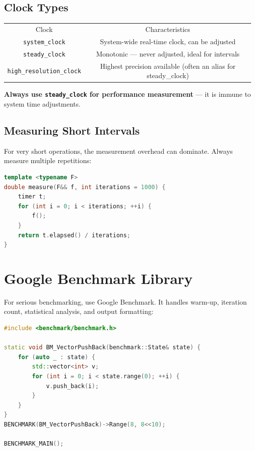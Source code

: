 \subsection{Clock Types}

\begin{center}
\begin{tabular}{cc}
\toprule
Clock & Characteristics \\
\texttt{system\_clock} & System-wide real-time clock, can be adjusted \\
\texttt{steady\_clock} & Monotonic — never adjusted, ideal for intervals \\
\texttt{high\_resolution\_clock} & Highest precision available (often an alias for steady\_clock) \\

\bottomrule
\end{tabular}
\end{center}
\textbf{Always use \texttt{steady\_clock} for performance measurement} — it is immune to system time adjustments.

\subsection{Measuring Short Intervals}

For very short operations, the measurement overhead can dominate. Always measure multiple repetitions:

\begin{lstlisting}[language=C++]
template <typename F>
double measure(F&& f, int iterations = 1000) {
    timer t;
    for (int i = 0; i < iterations; ++i) {
        f();
    }
    return t.elapsed() / iterations;
}
\end{lstlisting}

\section{Google Benchmark Library}

For serious benchmarking, use Google Benchmark. It handles warm-up, iteration count, statistical analysis, and output formatting:

\begin{lstlisting}[language=C++]
#include <benchmark/benchmark.h>

static void BM_VectorPushBack(benchmark::State& state) {
    for (auto _ : state) {
        std::vector<int> v;
        for (int i = 0; i < state.range(0); ++i) {
            v.push_back(i);
        }
    }
}
BENCHMARK(BM_VectorPushBack)->Range(8, 8<<10);

BENCHMARK_MAIN();
\end{lstlisting}

